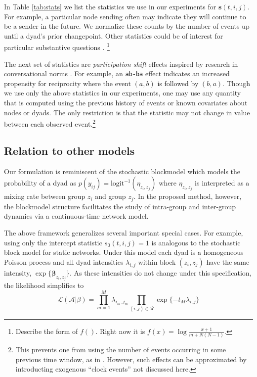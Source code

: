 In Table \ref{tab:stats} we list the statistics we use in our experiments for  $\mathbf{s}(t,i,j)$.
For example, a particular node sending often may indicate they will continue to be a sender in the future.
We normalize these counts by the number of events up until a dyad's prior changepoint. %
Other statistics could be of interest for particular substantive questions \cite{Butts2008,Vu2011}.  \footnote{Describe the form of $f()$.  Right now it is $f(x) = \log \frac{x+1}{m + N(N-1)}$.}

The next set of statistics are \emph{participation shift} effects inspired by research in conversational norms \cite{Gibson2003}.
For example, an \texttt{ab-ba} effect indicates an increased propensity for reciprocity where the event $(a,b)$ is followed by $(b,a)$.
Though we use only the above statistics in our experiments, one may use any quantity that is computed using the previous history of events or known covariates about nodes or dyads.
The only restriction is that the statistic may not change in value between each observed event.\footnote{This prevents one from using the number of events occurring in some previous time window, as in \cite{Gunawardana2011}.  However, such effects can be approximated by introducting exogenous ``clock events'' not discussed here.}

\subsection{Relation to other models}

Our formulation is reminiscent of the stochastic blockmodel \cite{Nowicki2001,Kemp} which models the probability of a dyad as $p(y_{ij}) =\mbox{logit}^{-1}( \eta_{z_i,z_j})$ where $\eta_{z_i,z_j}$ is interpreted as a mixing rate between group $z_i$ and group $z_j$.
In the proposed method, however, the blockmodel structure facilitates the study of intra-group and inter-group dynamics via a continuous-time network model.

The above framework generalizes several important special cases.
For example,  using only the intercept statistic $s_0(t,i,j) = 1$ is analogous to the stochastic block model for static networks.
Under this model each dyad is a homogeneous Poisson process and all dyad intensities $\lambda_{i,j}$ within block $(z_i,z_j)$ have the same intensity, $\exp\{\boldsymbol{\beta}_{z_i,z_j}\}$.
As these intensities do not change under this specification, the likelihood simplifies to
$$\mathcal{L}(\mathcal{A}|\beta) = \prod_{m=1}^M \lambda_{i_m,j_m} \prod_{(i,j) \in \mathcal{R}} \exp\{-t_M \lambda_{i,j}\}$$

